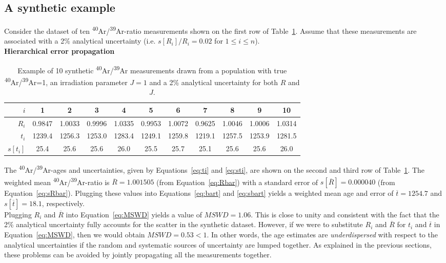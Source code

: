 \documentclass{article}
\begin{document}
\subsection{A synthetic example}
\label{sec:example}

Consider the dataset of ten
\textsuperscript{40}Ar/\textsuperscript{39}Ar-ratio measurements shown
on the first row of Table~\ref{tab:example}.  Assume that these
measurements are associated with a 2\% analytical uncertainty
(i.e. $s[R_i]/R_i = 0.02$ for $1 \leq i \leq n$).\\

\noindent\textbf{Hierarchical error propagation}\\

\begin{table}[!ht]
  \centering
  \begin{tabular}{r|c@{~}c@{~}c@{~}c@{~}c@{~}c@{~}c@{~}c@{~}c@{~}c}
    $i$ & 1 & 2 & 3 & 4 & 5 & 6 & 7 & 8 & 9 & 10 \\ \hline
    $R_i$ & 0.9847 & 1.0033 & 0.9996 & 1.0335 & 0.9953 &
    1.0072 & 0.9625 & 1.0046 & 1.0006 & 1.0314 \\
    $t_i$ & 1239.4 & 1256.3 & 1253.0 & 1283.4 & 1249.1 &
    1259.8 & 1219.1 & 1257.5 & 1253.9 & 1281.5 \\
    $s[t_i]$  & 25.4 & 25.6 & 25.6 & 26.0 & 25.5 &
    25.7 & 25.1 & 25.6 & 25.6 & 26.0
  \end{tabular}
  \caption{Example of 10 synthetic
    \textsuperscript{40}Ar/\textsuperscript{39}Ar measurements drawn
    from a population with true
    \textsuperscript{40}Ar/\textsuperscript{39}Ar=1, an irradiation
    parameter $J = 1$ and a 2\% analytical uncertainty for both $R$
    and $J$.}
  \label{tab:example}
\end{table}

The \textsuperscript{40}Ar/\textsuperscript{39}Ar-ages and
uncertainties, given by Equations~\ref{eq:ti} and \ref{eq:sti}, are
shown on the second and third row of Table~\ref{tab:example}.  The
weighted mean \textsuperscript{40}Ar/\textsuperscript{39}Ar-ratio is
$\overline{R} = 1.001505$ (from Equation~\ref{eq:Rbar}) with a
standard error of $s[\overline{R}] = 0.000040$ (from
Equation~\ref{eq:sRbar}). Plugging these values into
Equations~\ref{eq:bart} and \ref{eq:sbart} yields a weighted mean age
and error of $\overline{t} = 1254.7$ and $s[\overline{t}] = 18.1$,
respectively.\\

Plugging $R_i$ and $\overline{R}$ into Equation~\ref{eq:MSWD} yields a
value of $MSWD = 1.06$. This is close to unity and consistent with the
fact that the 2\% analytical uncertainty fully accounts for the
scatter in the synthetic dataset. However, if we were to substitute
$R_i$ and $\overline{R}$ for $t_i$ and $\overline{t}$ in
Equation~\ref{eq:MSWD}, then we would obtain $MSWD = 0.53 < 1$.  In
other words, the age estimates are \emph{underdispersed} with respect
to the analytical uncertainties if the random and systematic sources
of uncertainty are lumped together. As explained in the previous
sections, these problems can be avoided by jointly propagating all the
measurements together.\\
\end{document}
